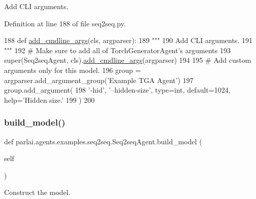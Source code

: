 \begin{DoxyVerb}Add CLI arguments.
\end{DoxyVerb}
 

Definition at line 188 of file seq2seq.\+py.


\begin{DoxyCode}
188     \textcolor{keyword}{def }\hyperlink{namespaceparlai_1_1agents_1_1drqa_1_1config_a62fdd5554f1da6be0cba185271058320}{add\_cmdline\_args}(cls, argparser):
189         \textcolor{stringliteral}{"""}
190 \textcolor{stringliteral}{        Add CLI arguments.}
191 \textcolor{stringliteral}{        """}
192         \textcolor{comment}{# Make sure to add all of TorchGeneratorAgent's arguments}
193         super(Seq2seqAgent, cls).\hyperlink{namespaceparlai_1_1agents_1_1drqa_1_1config_a62fdd5554f1da6be0cba185271058320}{add\_cmdline\_args}(argparser)
194 
195         \textcolor{comment}{# Add custom arguments only for this model.}
196         group = argparser.add\_argument\_group(\textcolor{stringliteral}{'Example TGA Agent'})
197         group.add\_argument(
198             \textcolor{stringliteral}{'-hid'}, \textcolor{stringliteral}{'--hidden-size'}, type=int, default=1024, help=\textcolor{stringliteral}{'Hidden size.'}
199         )
200 
\end{DoxyCode}
\mbox{\label{classparlai_1_1agents_1_1examples_1_1seq2seq_1_1Seq2seqAgent_a8fb044759c577db92eb9fb72865f0f72}} 
\subsubsection{\texorpdfstring{build\+\_\+model()}{build\_model()}}
{\footnotesize\ttfamily def parlai.\+agents.\+examples.\+seq2seq.\+Seq2seq\+Agent.\+build\+\_\+model (\begin{DoxyParamCaption}\item[{}]{self }\end{DoxyParamCaption})}

\begin{DoxyVerb}Construct the model.
\end{DoxyVerb}
 

